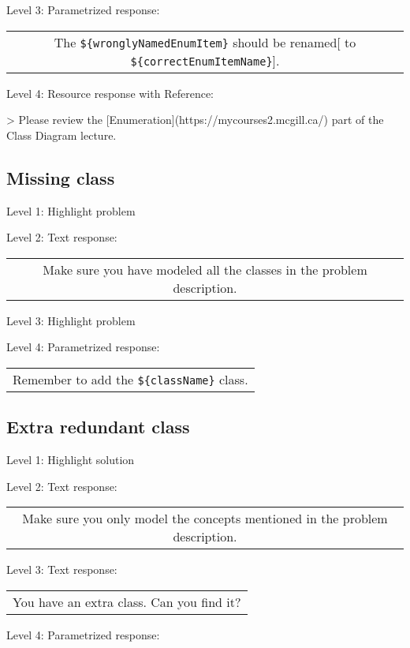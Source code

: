 \noindent Level 3: Parametrized response: \medskip

\begin{tabular}{|c}
The \verb|${wronglyNamedEnumItem}| should be renamed[ to \verb|${correctEnumItemName}|].
\end{tabular} \medskip

\noindent Level 4: Resource response with Reference:

> Please review the [Enumeration](https://mycourses2.mcgill.ca/) part of the Class Diagram lecture.


\subsection{Missing class}

\noindent Level 1: Highlight problem \medskip

\noindent Level 2: Text response: \medskip

\begin{tabular}{|c}
Make sure you have modeled all the classes in the problem description.
\end{tabular} \medskip

\noindent Level 3: Highlight problem \medskip

\noindent Level 4: Parametrized response: \medskip

\begin{tabular}{|c}
Remember to add the \verb|${className}| class.
\end{tabular} \medskip


\subsection{Extra redundant class}

\noindent Level 1: Highlight solution \medskip

\noindent Level 2: Text response: \medskip

\begin{tabular}{|c}
Make sure you only model the concepts mentioned in the problem description.
\end{tabular} \medskip

\noindent Level 3: Text response: \medskip

\begin{tabular}{|c}
You have an extra class. Can you find it?
\end{tabular} \medskip

\noindent Level 4: Parametrized response: \medskip


